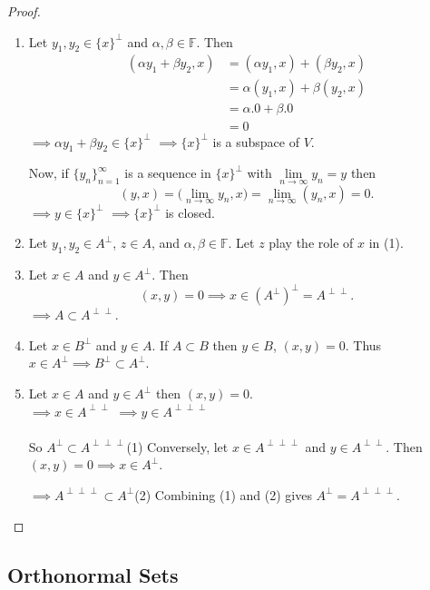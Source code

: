 \documentclass[11pt,a4paper]{article}
\theoremstyle{definition}
\begin{document}
\begin{proof}
\begin{enumerate}
\item Let $y_1,y_2\in \{x\}^{\perp}$ and $\alpha,\beta \in \mathbb{F}$. Then
\begin{align*}
(\alpha y_1+\beta y_2,x) &=(\alpha y_1,x)+(\beta y_2,x)\\
                         &=\alpha(y_1,x)+\beta(y_2,x)\\
                         &=\alpha .0+\beta .0\\
                         &=0
\end{align*}
$\implies \alpha y_1+\beta y_2\in \{x\}^{\perp}$
$\implies \{x\}^{\perp}$ is a subspace of $V$.

Now, if $\{y_n\}^{\infty}_{n=1}$ is a sequence in $\{x\}^{\perp}$ with $\lim\limits_{n\rightarrow \infty}y_n=y$ then $$(y,x)=\Big(\lim_{n\rightarrow \infty}y_n,x\Big)=\lim_{n\rightarrow \infty}(y_n,x)=0.$$
$\implies y\in \{x\}^{\perp}$
$\implies \{x\}^{\perp}$ is closed.

\item Let $y_1,y_2\in A^{\perp}$, $z\in A$, and $\alpha, \beta \in \mathbb{F}$.
Let $z$ play the role of $x$ in (1).

\item Let $x\in A$ and $y\in A^{\perp}$. Then $$(x,y)=0\implies x\in (A^{\perp})^{\perp}=A^{\perp \perp}.$$ $\implies A\subset A^{\perp \perp}$.\\

\item Let $x\in B^{\perp}$ and $y\in A$. If $A\subset B$ then $y\in B$, $(x,y)=0$. Thus $x\in A^{\perp}\implies B^{\perp}\subset A^{\perp}$.

\item Let $x\in A$ and $y\in A^{\perp}$ then $(x,y)=0$.\\$\implies x\in A^{\perp \perp}$ $\implies y\in A^{\perp \perp \perp}$\\\\ So $A^{\perp}\subset A^{\perp \perp \perp}$\qquad (1)
Conversely, let $x\in A^{\perp \perp \perp}$ and $y\in A^{\perp \perp}$. Then $(x,y)=0\implies x\in A^{\perp}$.

$\implies A^{\perp \perp \perp}\subset A^{\perp}$\qquad (2)
Combining (1) and (2) gives $A^{\perp}=A^{\perp \perp \perp}$.
\end{enumerate}
\end{proof}


\subsection{Orthonormal Sets}
\end{document}
